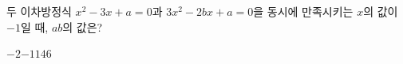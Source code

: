 두 이차방정식 $x^2-3x+a=0$과 $3x^2-2bx+a=0$을 동시에 만족시키는 $x$의 값이 $-1$일 때, $ab$의 값은? 
\begin{choices32}{$-2$}{$-1$}{$1$}{$4$}{$6$}\end{choices32}
